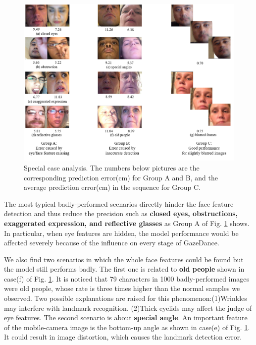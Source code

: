 \documentclass[acmlarge]{acmart}
\begin{document}
\begin{figure} 
  \centering
  \includegraphics[scale=0.5]{pictures/analysis.jpg}
  \caption{Special case analysis. The numbers below pictures are the corresponding prediction error(cm) for Group A and B, and the average prediction error(cm) in the sequence for Group C.}
  \label{fourtp}
\end{figure}

The most typical badly-performed scenarios directly hinder the face feature detection and thus reduce the precision such as \textbf{closed eyes, obstructions, exaggerated expression, and reflective glasses} as Group A of Fig. \ref{fourtp} shows. In particular, when eye features are hidden, the model performance would be affected severely because of the influence on every stage of GazeDance. 


We also find two scenarios in which the whole face features could be found but the model still performs badly. The first one is related to \textbf{old people} shown in case(f) of Fig. \ref{fourtp}. It is noticed that 79 characters in 1000 badly-performed images were old people, whose rate is three times higher than the normal samples we observed. Two possible explanations are raised for this phenomenon:(1)Wrinkles may interfere with landmark recognition. (2)Thick eyelids may affect the judge of eye features. The second scenario is about \textbf{special angle}. An important feature of the mobile-camera image is the bottom-up angle as shown in case(e) of Fig. \ref{fourtp}. It could result in image distortion, which causes the landmark detection error.
\end{document}
